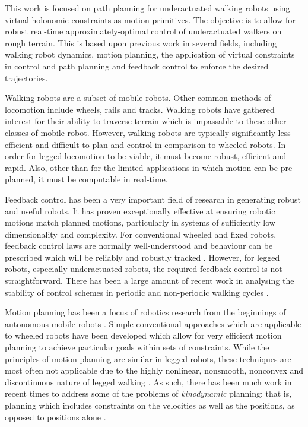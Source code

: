This work is focused on path planning for underactuated walking robots using virtual holonomic constraints as motion primitives. The objective is to allow for robust real-time approximately-optimal control of underactuated walkers on rough terrain. This is based upon previous work in several fields, including walking robot dynamics, motion planning, the application of virtual constraints in control and path planning and feedback control to enforce the desired trajectories.

Walking robots are a subset of mobile robots. Other common methods of locomotion include wheels, rails and tracks. Walking robots have gathered interest for their ability to traverse terrain which is impassable to these other classes of mobile robot. However, walking robots are typically significantly less efficient and difficult to plan and control in comparison to wheeled robots. In order for legged locomotion to be viable, it must become robust, efficient and rapid. Also, other than for the limited applications in which motion can be pre-planned, it must be computable in real-time.

Feedback control has been a very important field of research in generating robust and useful robots. It has proven exceptionally effective at ensuring robotic motions match planned motions, particularly in systems of sufficiently low dimensionality and complexity. For conventional wheeled and fixed robots, feedback control laws are normally well-understood and behaviour can be prescribed which will be reliably and robustly tracked \cite{rivera1986internal}. However, for legged robots, especially underactuated robots, the required feedback control is not straightforward. There has been a large amount of recent work in analysing the stability of control schemes in periodic and non-periodic walking cycles \cite{shiriaev2005constructive, canudas2004concept, sreenath2011compliant}.

Motion planning has been a focus of robotics research from the beginnings of autonomous mobile robots \cite{georgeff1987reactive}. Simple conventional approaches which are applicable to wheeled robots have been developed which allow for very efficient motion planning to achieve particular goals within sets of constraints. While the principles of motion planning are similar in legged robots, these techniques are most often not applicable due to the highly nonlinear, nonsmooth, nonconvex and discontinuous nature of legged walking \cite{manchester13planning}. As such, there has been much work in recent times to address some of the problems of \textit{kinodynamic} planning; that is, planning which includes constraints on the velocities as well as the positions, as opposed to positions alone \cite{lavalle2001randomized, manchester13planning}.

